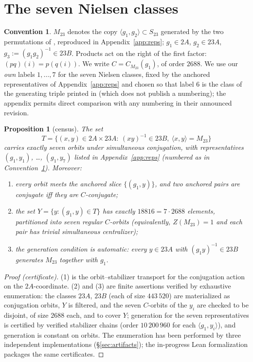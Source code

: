 \documentclass[11pt]{amsart}
\newcommand{\Mtw}{M_{23}}
\theoremstyle{plain}
\newtheorem{proposition}[theorem]{Proposition}
\theoremstyle{definition}
\newtheorem{convention}[theorem]{Convention}
\begin{document}
\section{The seven Nielsen classes}\label{sec:census}

\begin{convention}\label{conv:group}
$\Mtw$ denotes the copy $\langle g_1,g_2\rangle\subset S_{23}$
generated by the two permutations of \cite{HJLPPZ},
reproduced in Appendix~\ref{app:reps}; $g_1\in 2A$, $g_2\in 23A$,
$g_3:=(g_1g_2)^{-1}\in 23B$. Products act on the right of the first
factor: $(pq)(i)=p(q(i))$. We write $C=C_{\Mtw}(g_1)$, of order
$2688$. We use our \emph{own} labels $1,\dots,7$ for the seven
Nielsen classes, fixed by the anchored representatives of
Appendix~\ref{app:reps} and chosen so that label $6$ is the class
of the generating triple printed in \cite{HJLPPZ} (which does not
publish a numbering); the appendix permits direct comparison with
any numbering in their announced revision.
\end{convention}

\begin{proposition}[census]\label{prop:census}
The set
\[
  T=\bigl\{(x,y)\in 2A\times 23A :\ (xy)^{-1}\in 23B,\
  \langle x,y\rangle = \Mtw\bigr\}
\]
carries exactly seven orbits under simultaneous conjugation, with
representatives $(g_1,y_1)$, \dots, $(g_1,y_7)$ listed in
Appendix~\ref{app:reps} (numbered as in
Convention~\ref{conv:group}). Moreover:
\begin{enumerate}
\item every orbit meets the anchored slice $\{(g_1,y)\}$, and two
  anchored pairs are conjugate iff they are $C$-conjugate;
\item the set $Y=\{y : (g_1,y)\in T\}$ has exactly
  $18816 = 7\cdot 2688$ elements, partitioned into seven
  \emph{regular} $C$-orbits (equivalently, $Z(\Mtw)=1$ and each pair
  has trivial simultaneous centralizer);
\item the generation condition is automatic: every $y\in 23A$ with
  $(g_1y)^{-1}\in 23B$ generates $\Mtw$ together with $g_1$.
\end{enumerate}
\end{proposition}

\begin{proof}[Proof (certificate)]
(1) is the orbit--stabilizer transport for the conjugation action on
the $2A$-coordinate. (2) and (3) are finite assertions verified by
exhaustive enumeration: the classes $23A$, $23B$ (each of size
$443\,520$) are materialized as conjugation orbits, $Y$ is filtered,
and the seven $C$-orbits of the $y_i$ are checked to be disjoint, of
size $2688$ each, and to cover $Y$; generation for the seven
representatives is certified by verified stabilizer chains
(order $10\,200\,960$ for each $\langle g_1,y_i\rangle$), and
generation is constant on orbits. The enumeration has been performed
by three independent implementations (\S\ref{sec:artifacts});
the in-progress Lean formalization packages the same certificates.
\end{proof}
\end{document}
